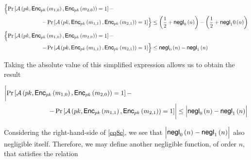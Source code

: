 \documentclass[../CryptoHW3.tex]{subfiles}
\begin{document}
\begin{flushleft}
\begin{align*}
  &\Bigl\{ \Pr \left[ \mathcal{A} \left( pk,  \text{{\fontfamily{phv}\selectfont Enc}}_{pk} \left( m_{1, 0} \right), \text{{\fontfamily{phv}\selectfont Enc}}_{pk} \left( m_{2, 0} \right) \right) = 1 \right] - \Bigr. \\
  &\Bigl. \qquad \qquad \qquad \quad - \Pr \left[ \mathcal{A} \left( pk,  \text{{\fontfamily{phv}\selectfont Enc}}_{pk} \left( m_{1, 1} \right), \text{{\fontfamily{phv}\selectfont Enc}}_{pk} \left( m_{2, 1} \right) \right) = 1 \right] \Bigr\} \leq \left( \frac{1}{2} + \text{{\fontfamily{phv}\selectfont negl}}_0 \left( n \right) \right) - \left( \frac{1}{2} + \text{{\fontfamily{phv}\selectfont negl}}_10 \left( n \right) \right) \\
  &\Bigl\{ \Pr \left[ \mathcal{A} \left( pk,  \text{{\fontfamily{phv}\selectfont Enc}}_{pk} \left( m_{1, 0} \right), \text{{\fontfamily{phv}\selectfont Enc}}_{pk} \left( m_{2, 0} \right) \right) = 1 \right] - \Bigr. \\
  &\Bigl. \qquad \qquad \qquad \quad - \Pr \left[ \mathcal{A} \left( pk,  \text{{\fontfamily{phv}\selectfont Enc}}_{pk} \left( m_{1, 1} \right), \text{{\fontfamily{phv}\selectfont Enc}}_{pk} \left( m_{2, 1} \right) \right) = 1 \right] \Bigr\} \leq \text{{\fontfamily{phv}\selectfont negl}}_0 \left( n \right) - \text{{\fontfamily{phv}\selectfont negl}}_1 \left( n \right)
\end{align*}

Taking the absolute value of this simplified expression allows us to obtain the result

\begin{align}
  &\biggl| \Pr \left[ \mathcal{A} \left( pk,  \text{{\fontfamily{phv}\selectfont Enc}}_{pk} \left( m_{1, 0} \right), \text{{\fontfamily{phv}\selectfont Enc}}_{pk} \left( m_{2, 0} \right) \right) = 1 \right] - \biggr. \notag \\
  &\biggl. \qquad \qquad \qquad \quad - \Pr \left[ \mathcal{A} \left( pk,  \text{{\fontfamily{phv}\selectfont Enc}}_{pk} \left( m_{1, 1} \right), \text{{\fontfamily{phv}\selectfont Enc}}_{pk} \left( m_{2, 1} \right) \right) = 1 \right] \biggr| \leq \Bigl| \text{{\fontfamily{phv}\selectfont negl}}_0 \left( n \right) - \text{{\fontfamily{phv}\selectfont negl}}_1 \left( n \right) \Bigr|  \label{eq8e}
\end{align}

Considering the right-hand-side of \ref{eq8e}, we see that $\Bigl| \text{{\fontfamily{phv}\selectfont negl}}_0 \left( n \right) - \text{{\fontfamily{phv}\selectfont negl}}_1 \left( n \right) \Bigr|$ also negligible itself.  Therefore, we may define another negligible function, of order $n$, that satisfies the relation


\end{flushleft}
\end{document}
